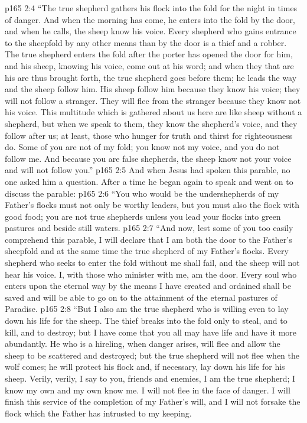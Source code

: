 \vs p165 2:4 \textcolor{ubdarkred}{“The true shepherd gathers his flock into the fold for the night in times of danger. And when the morning has come, he enters into the fold by the door, and when he calls, the sheep know his voice. Every shepherd who gains entrance to the sheepfold by any other means than by the door is a thief and a robber. The true shepherd enters the fold after the porter has opened the door for him, and his sheep, knowing his voice, come out at his word; and when they that are his are thus brought forth, the true shepherd goes before them; he leads the way and the sheep follow him. His sheep follow him because they know his voice; they will not follow a stranger. They will flee from the stranger because they know not his voice. This multitude which is gathered about us here are like sheep without a shepherd, but when we speak to them, they know the shepherd’s voice, and they follow after us; at least, those who hunger for truth and thirst for righteousness do. Some of you are not of my fold; you know not my voice, and you do not follow me. And because you are false shepherds, the sheep know not your voice and will not follow you.”}
\pc \vs p165 2:5 And when Jesus had spoken this parable, no one asked him a question. After a time he began again to speak and went on to discuss the parable:
\vs p165 2:6 \textcolor{ubdarkred}{“You who would be the undershepherds of my Father’s flocks must not only be worthy leaders, but you must also  the flock with good food; you are not true shepherds unless you lead your flocks into green pastures and beside still waters.}
\vs p165 2:7 \textcolor{ubdarkred}{“And now, lest some of you too easily comprehend this parable, I will declare that I am both the door to the Father’s sheepfold and at the same time the true shepherd of my Father’s flocks. Every shepherd who seeks to enter the fold without me shall fail, and the sheep will not hear his voice. I, with those who minister with me, am the door. Every soul who enters upon the eternal way by the means I have created and ordained shall be saved and will be able to go on to the attainment of the eternal pastures of Paradise.}
\vs p165 2:8 \textcolor{ubdarkred}{“But I also am the true shepherd who is willing even to lay down his life for the sheep. The thief breaks into the fold only to steal, and to kill, and to destroy; but I have come that you all may have life and have it more abundantly. He who is a hireling, when danger arises, will flee and allow the sheep to be scattered and destroyed; but the true shepherd will not flee when the wolf comes; he will protect his flock and, if necessary, lay down his life for his sheep. Verily, verily, I say to you, friends and enemies, I am the true shepherd; I know my own and my own know me. I will not flee in the face of danger. I will finish this service of the completion of my Father’s will, and I will not forsake the flock which the Father has intrusted to my keeping.}
